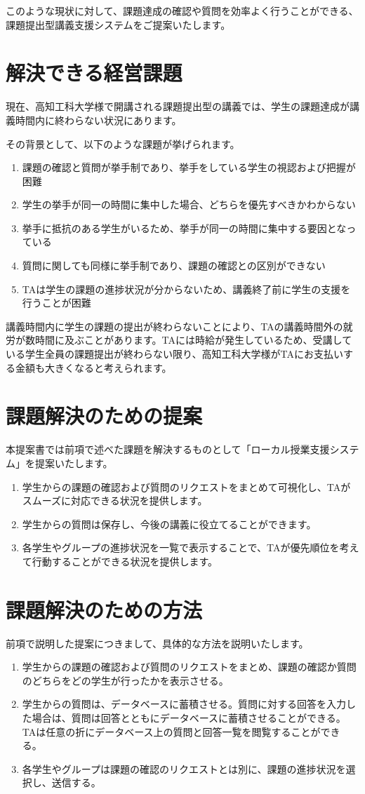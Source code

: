 \documentclass[a4j,titlepage]{ujarticle}
\begin{document}
このような現状に対して、課題達成の確認や質問を効率よく行うことができる、課題提出型講義支援システムをご提案いたします。

\section{解決できる経営課題}
現在、高知工科大学様で開講される課題提出型の講義では、学生の課題達成が講義時間内に終わらない状況にあります。

その背景として、以下のような課題が挙げられます。
\begin{enumerate}[(1)]
\item 課題の確認と質問が挙手制であり、挙手をしている学生の視認および把握が困難
\item 学生の挙手が同一の時間に集中した場合、どちらを優先すべきかわからない
\item 挙手に抵抗のある学生がいるため、挙手が同一の時間に集中する要因となっている
\item 質問に関しても同様に挙手制であり、課題の確認との区別ができない
\item TAは学生の課題の進捗状況が分からないため、講義終了前に学生の支援を行うことが困難
\end{enumerate}
講義時間内に学生の課題の提出が終わらないことにより、TAの講義時間外の就労が数時間に及ぶことがあります。TAには時給が発生しているため、受講している学生全員の課題提出が終わらない限り、高知工科大学様がTAにお支払いする金額も大きくなると考えられます。

\section{課題解決のための提案}
本提案書では前項で述べた課題を解決するものとして「ローカル授業支援システム」を提案いたします。

\begin{enumerate}[(1)]
\item 学生からの課題の確認および質問のリクエストをまとめて可視化し、TAがスムーズに対応できる状況を提供します。
\item 学生からの質問は保存し、今後の講義に役立てることができます。
\item 各学生やグループの進捗状況を一覧で表示することで、TAが優先順位を考えて行動することができる状況を提供します。
\end{enumerate}

\section{課題解決のための方法}
前項で説明した提案につきまして、具体的な方法を説明いたします。
\begin{enumerate}[(1)]
\item 学生からの課題の確認および質問のリクエストをまとめ、課題の確認か質問のどちらをどの学生が行ったかを表示させる。
\item 学生からの質問は、データベースに蓄積させる。質問に対する回答を入力した場合は、質問は回答とともにデータベースに蓄積させることができる。TAは任意の折にデータベース上の質問と回答一覧を閲覧することができる。
\item 各学生やグループは課題の確認のリクエストとは別に、課題の進捗状況を選択し、送信する。
\end{enumerate}
\end{document}

